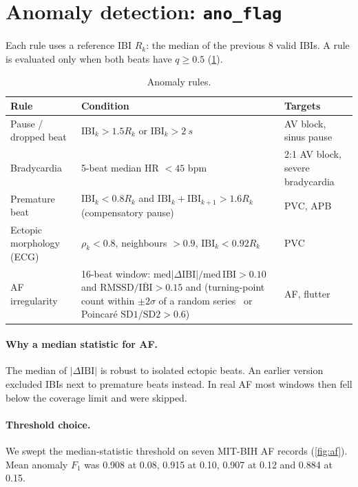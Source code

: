\documentclass[10pt,a4paper]{article}
\newcommand{\code}[1]{\texttt{#1}}
\newcommand{\ibi}{\mathrm{IBI}}
\begin{document}
\section{Anomaly detection: \texorpdfstring{\code{ano\_flag}}{anomaly flag}}\label{sec:anomaly}
Each rule uses a reference IBI $R_k$: the median of the previous 8 valid IBIs. A rule is evaluated only when both
beats have $q\ge0.5$ (\cref{tab:rules}).

\begin{table}[h]
\centering\small
\caption{Anomaly rules.}
\label{tab:rules}
\begin{tabularx}{\linewidth}{@{}lXl@{}}
\toprule
Rule & Condition & Targets\\
\midrule
Pause / dropped beat & $\ibi_k > 1.5R_k$ or $\ibi_k>\SI{2}{s}$ & AV block, sinus pause\\
Bradycardia & 5-beat median HR $<45$ bpm & 2:1 AV block, severe bradycardia\\
Premature beat & $\ibi_k<0.8R_k$ and $\ibi_k+\ibi_{k+1}>1.6R_k$ (compensatory pause) & PVC, APB\\
Ectopic morphology (ECG) & $\rho_k<0.8$, neighbours $>0.9$, $\ibi_k<0.92R_k$ & PVC\\
AF irregularity & 16-beat window: $\mathrm{med}|\Delta\ibi|/\mathrm{med}\,\ibi>0.10$ and
                  $\mathrm{RMSSD}/\overline{\ibi}>0.15$ and (turning-point count within $\pm2\sigma$ of a random
                  series~\cite{dash} or Poincar\'e $\mathrm{SD1}/\mathrm{SD2}>0.6$) & AF, flutter\\
\bottomrule
\end{tabularx}
\end{table}

\paragraph{Why a median statistic for AF.}
The median of $|\Delta\ibi|$ is robust to isolated ectopic beats. An earlier version excluded IBIs next to premature
beats instead. In real AF most windows then fell below the coverage limit and were skipped.

\paragraph{Threshold choice.}
We swept the median-statistic threshold on seven MIT-BIH AF records (\cref{fig:af}). Mean anomaly $F_1$ was 0.908 at
0.08, 0.915 at 0.10, 0.907 at 0.12 and 0.884 at 0.15.
\end{document}
